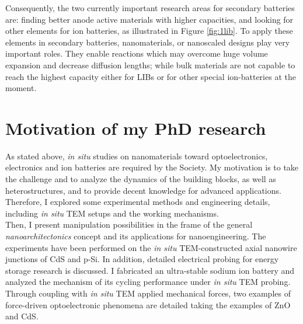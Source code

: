 Consequently, the two currently important research areas for secondary batteries are: finding better anode active materials with higher capacities, and looking for other elements for ion batteries, as illustrated in Figure \ref{fig:1lib}. To apply these elements in secondary batteries, nanomaterials, or nanoscaled designs play very important roles. They enable reactions which may overcome huge volume expansion and decrease diffusion lengths; while bulk materials are not capable to reach the highest capacity either for LIBs or for other special ion-batteries at the moment. 

\section{Motivation of my PhD research}
As stated above, {\em in situ} studies on nanomaterials toward optoelectronics, electronics and ion batteries are required by the Society. My motivation is to take the challenge and to analyze the dynamics of the building blocks, as well as heterostructures, and to provide decent knowledge for advanced applications. 
Therefore, I explored some experimental methods and engineering details, including {\em in situ} TEM setups and the working mechanisms. \\
Then, I present manipulation possibilities in the frame of the general \textit{nanoarchitectonics} concept and its applications for nanoengineering. The experiments have been performed on the {\em in situ} TEM-constructed axial nanowire junctions of CdS and p-Si. In addition, detailed electrical probing for energy storage research is discussed. I fabricated an ultra-stable sodium ion battery and analyzed the mechanism of its cycling performance under {\em in situ} TEM probing. Through coupling with {\em in situ} TEM applied mechanical forces, two examples of force-driven optoelectronic phenomena are detailed taking the examples of ZnO and CdS. 
